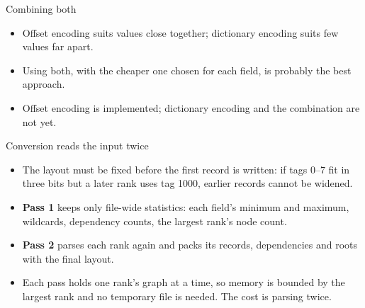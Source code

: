 \documentclass[aspectratio=169,11pt]{beamer}
\newcommand{\diagram}[1]{\resizebox{\linewidth}{!}{}}
\begin{document}
\begin{frame}{Combining both}
\begin{itemize}
\item Offset encoding suits values close together; dictionary encoding suits few values far apart.
\item Using both, with the cheaper one chosen for each field, is probably the best approach.
\item Offset encoding is implemented; dictionary encoding and the combination are not yet.
\end{itemize}
\end{frame}

\begin{frame}{Conversion reads the input twice}
\diagram{conversion-overview}
\vspace{3mm}
\begin{itemize}
\item The layout must be fixed before the first record is written: if tags 0--7 fit in three bits but a later rank uses tag 1000, earlier records cannot be widened.
\item \textbf{Pass 1} keeps only file-wide statistics: each field's minimum and maximum, wildcards, dependency counts, the largest rank's node count.
\item \textbf{Pass 2} parses each rank again and packs its records, dependencies and roots with the final layout.
\item Each pass holds one rank's graph at a time, so memory is bounded by the largest rank and no temporary file is needed. The cost is parsing twice.
\end{itemize}
\end{frame}
\end{document}
